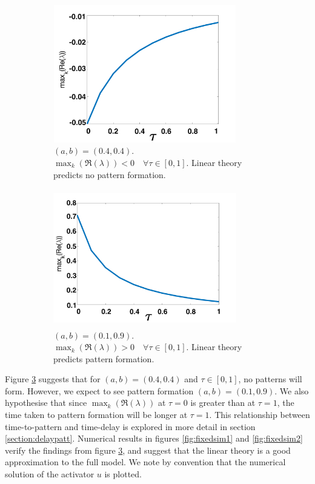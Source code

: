 \documentclass[12pt]{report}
\begin{document}
\begin{figure}[H]
    \centering
    \begin{subfigure}[b]{0.45\textwidth}
        \centering
        \includegraphics[width=8cm,height = 6cm]{disp1.png}
        \caption{$(a,b)=(0.4,0.4)$. $\max_k(\Re(\lambda))<0 \quad \forall\tau\in[0,1]$. Linear theory predicts no pattern formation. }
        \label{}
    \end{subfigure}
    \hfill
    \begin{subfigure}[b]{0.45\textwidth}
        \centering
        \includegraphics[width=8cm,height = 6cm]{disp2.png}
        \caption{$(a,b)=(0.1,0.9)$. $\max_k(\Re(\lambda))>0 \quad \forall\tau\in[0,1]$. Linear theory predicts pattern formation.}
        \label{}
    \end{subfigure}
    \caption{}
    \label{fig:dispfixed}
\end{figure}
Figure \ref{fig:dispfixed} suggests that for $(a,b)=(0.4,0.4)$ and $\tau\in[0,1]$, no patterns will form. However, we expect to see pattern formation $(a,b)=(0.1,0.9)$. We also hypothesise that since $\max_k(\Re(\lambda))$ at $\tau=0$ is greater than at $\tau=1$, the time taken to pattern formation will be longer at $\tau=1$. This relationship between time-to-pattern and time-delay is explored in more detail in section \ref{section:delaypatt}. Numerical results in figures \ref{fig:fixedsim1} and \ref{fig:fixedsim2} verify the findings from figure \ref{fig:dispfixed}, and suggest that the linear theory is a good approximation to the full model. We note by convention that the numerical solution of the activator $u$ is plotted.
\end{document}
